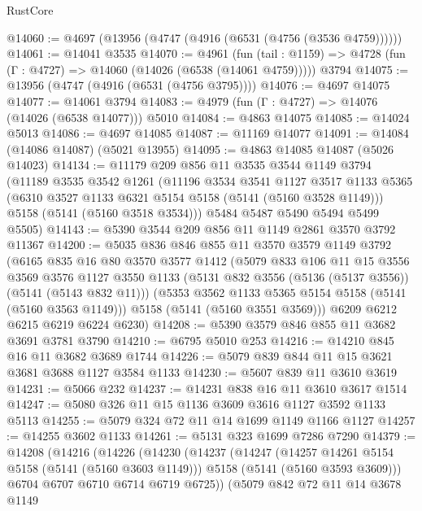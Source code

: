 \begin{lexlean}{RustCore}
\begin{coremodule}
@14060 := @4697 (@13956 (@4747 (@4916 (@6531 (@4756 (@3536 @4759))))))
@14061 := @14041 @3535
@14070 := @4961
    (fun (tail : @1159) => @4728 (fun (Γ : @4727) => @14060 (@14026 (@6538 (@14061 @4759)))))
    @3794
@14075 := @13956 (@4747 (@4916 (@6531 (@4756 @3795))))
@14076 := @4697 @14075
@14077 := @14061 @3794
@14083 := @4979 (fun (Γ : @4727) => @14076 (@14026 (@6538 @14077))) @5010
@14084 := @4863 @14075
@14085 := @14024 @5013
@14086 := @4697 @14085
@14087 := @11169 @14077
@14091 := @14084 (@14086 @14087) (@5021 @13955)
@14095 := @4863 @14085 @14087 (@5026 @14023)
@14134 := @11179
    @209
    @856
    @11
    @3535
    @3544
    @1149
    @3794
    (@11189
      @3535
      @3542
      @1261
      (@11196
        @3534
        @3541
        @1127
        @3517
        @1133
        @5365
        (@6310 @3527 @1133 @6321 @5154 @5158 (@5141 (@5160 @3528 @1149)))
        @5158
        (@5141 (@5160 @3518 @3534)))
      @5484
      @5487
      @5490
      @5494
      @5499
      @5505)
@14143 := @5390 @3544 @209 @856 @11 @1149 @2861 @3570 @3792 @11367
@14200 := @5035
    @836
    @846
    @855
    @11
    @3570
    @3579
    @1149
    @3792
    (@6165
      @835
      @16
      @80
      @3570
      @3577
      @1412
      (@5079
        @833
        @106
        @11
        @15
        @3556
        @3569
        @3576
        @1127
        @3550
        @1133
        (@5131 @832 @3556 (@5136 (@5137 @3556)) (@5141 (@5143 @832 @11)))
        (@5353 @3562 @1133 @5365 @5154 @5158 (@5141 (@5160 @3563 @1149)))
        @5158
        (@5141 (@5160 @3551 @3569)))
      @6209
      @6212
      @6215
      @6219
      @6224
      @6230)
@14208 := @5390 @3579 @846 @855 @11 @3682 @3691 @3781 @3790
@14210 := @6795 @5010 @253
@14216 := @14210 @845 @16 @11 @3682 @3689 @1744
@14226 := @5079 @839 @844 @11 @15 @3621 @3681 @3688 @1127 @3584 @1133
@14230 := @5607 @839 @11 @3610 @3619
@14231 := @5066 @232
@14237 := @14231 @838 @16 @11 @3610 @3617 @1514
@14247 := @5080 @326 @11 @15 @1136 @3609 @3616 @1127 @3592 @1133 @5113
@14255 := @5079 @324 @72 @11 @14 @1699 @1149 @1166 @1127
@14257 := @14255 @3602 @1133
@14261 := @5131 @323 @1699 @7286 @7290
@14379 := @14208
    (@14216
      (@14226
        (@14230
          (@14237
            (@14247
              (@14257 @14261 @5154 @5158 (@5141 (@5160 @3603 @1149)))
              @5158
              (@5141 (@5160 @3593 @3609)))
            @6704
            @6707
            @6710
            @6714
            @6719
            @6725))
        (@5079
          @842
          @72
          @11
          @14
          @3678
          @1149

\end{coremodule}
\end{lexlean}
